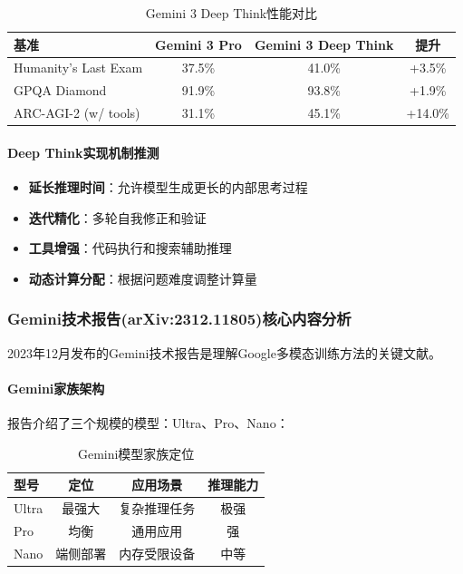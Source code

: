 \documentclass[12pt,a4paper]{article}
\begin{document}
\begin{table}[H]
\centering
\caption{Gemini 3 Deep Think性能对比}
\begin{tabular}{lccc}
\toprule
\textbf{基准} & \textbf{Gemini 3 Pro} & \textbf{Gemini 3 Deep Think} & \textbf{提升} \\
\midrule
Humanity's Last Exam & 37.5\% & 41.0\% & +3.5\% \\
GPQA Diamond & 91.9\% & 93.8\% & +1.9\% \\
ARC-AGI-2 (w/ tools) & 31.1\% & 45.1\% & +14.0\% \\
\bottomrule
\end{tabular}
\end{table}

\paragraph{Deep Think实现机制推测}

\begin{itemize}
    \item \textbf{延长推理时间}：允许模型生成更长的内部思考过程
    \item \textbf{迭代精化}：多轮自我修正和验证
    \item \textbf{工具增强}：代码执行和搜索辅助推理
    \item \textbf{动态计算分配}：根据问题难度调整计算量
\end{itemize}

\subsubsection{Gemini技术报告(arXiv:2312.11805)核心内容分析}

2023年12月发布的Gemini技术报告是理解Google多模态训练方法的关键文献。

\paragraph{Gemini家族架构}

报告介绍了三个规模的模型：Ultra、Pro、Nano：

\begin{table}[H]
\centering
\caption{Gemini模型家族定位}
\begin{tabular}{lccc}
\toprule
\textbf{型号} & \textbf{定位} & \textbf{应用场景} & \textbf{推理能力} \\
\midrule
Ultra & 最强大 & 复杂推理任务 & 极强 \\
Pro & 均衡 & 通用应用 & 强 \\
Nano & 端侧部署 & 内存受限设备 & 中等 \\
\bottomrule
\end{tabular}
\end{table}
\end{document}
